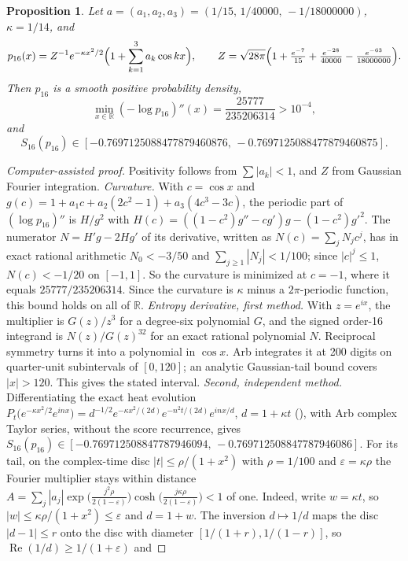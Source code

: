\documentclass[11pt]{article}
\newtheorem{proposition}[theorem]{Proposition}
\theoremstyle{definition}
\theoremstyle{remark}
\newcommand{\R}{\mathbb R}
\begin{document}
\begin{proposition}\label{prop:witness}
Let $a=(a_1,a_2,a_3)=(1/15,\,1/40000,\,-1/18000000)$, $\kappa=1/14$, and
\[
 p_{16}(x)=Z^{-1}e^{-\kappa x^2/2}\Bigl(1+\sum_{k=1}^3a_k\cos kx\Bigr),\qquad
 Z=\sqrt{28\pi}\Bigl(1+\tfrac{e^{-7}}{15}+\tfrac{e^{-28}}{40000}
 -\tfrac{e^{-63}}{18000000}\Bigr).
\]
Then $p_{16}$ is a smooth positive probability density,
\[
 \min_{x\in\R}(-\log p_{16})''(x)=\frac{25777}{235206314}>10^{-4},
\]
and
\[
 S_{16}(p_{16})\in[-0.7697125088477879460876,\,-0.7697125088477879460875].
\]
\end{proposition}

\begin{proof}[Computer-assisted proof]
Positivity follows from $\sum|a_k|<1$, and $Z$ from Gaussian Fourier integration.
\emph{Curvature.} With $c=\cos x$ and
$g(c)=1+a_1c+a_2(2c^2-1)+a_3(4c^3-3c)$, the periodic part of $(\log p_{16})''$ is
$H/g^2$ with $H(c)=((1-c^2)g''-cg')g-(1-c^2)g'^2$. The numerator $N=H'g-2Hg'$ of its
derivative, written as $N(c)=\sum_jN_jc^j$, has in exact rational arithmetic
$N_0<-3/50$ and $\sum_{j\ge1}|N_j|<1/100$; since $|c|^j\le1$, $N(c)<-1/20$ on $[-1,1]$. So the
curvature is minimized at $c=-1$, where it equals $25777/235206314$. Since the
curvature is $\kappa$ minus a $2\pi$-periodic function, this bound holds on all of $\R$.
\emph{Entropy derivative, first method.} With $z=e^{ix}$, the multiplier is
$G(z)/z^3$ for a degree-six polynomial $G$, and the signed order-16 integrand is
$N(z)/G(z)^{32}$ for an exact rational polynomial $N$. Reciprocal symmetry turns it
into a polynomial in $\cos x$. Arb integrates it at 200 digits on quarter-unit
subintervals of $[0,120]$; an analytic Gaussian-tail bound covers $|x|>120$. This gives
the stated interval.
\emph{Second, independent method.} Differentiating the exact heat evolution
$P_t\bigl(e^{-\kappa x^2/2}e^{inx}\bigr)=d^{-1/2}e^{-\kappa x^2/(2d)}e^{-n^2t/(2d)}e^{inx/d}$,
$d=1+\kappa t$ (\cite[Lemma~3]{ZFGW26}), with Arb complex Taylor series, without the
score recurrence, gives
$S_{16}(p_{16})\in[-0.769712508847787946094,\,-0.769712508847787946086]$.
For its tail, on the complex-time disc $|t|\le\rho/(1+x^2)$ with $\rho=1/100$ and
$\varepsilon=\kappa\rho$ the Fourier multiplier stays within distance
$A=\sum_j|a_j|\exp\bigl(\tfrac{j^2\rho}{2(1-\varepsilon)}\bigr)
\cosh\bigl(\tfrac{j\kappa\rho}{2(1-\varepsilon)}\bigr)<1$ of one. Indeed, write
$w=\kappa t$, so $|w|\le\kappa\rho/(1+x^2)\le\varepsilon$ and $d=1+w$. The inversion
$d\mapsto1/d$ maps the disc $|d-1|\le r$ onto the disc with diameter
$[1/(1+r),1/(1-r)]$, so $\operatorname{Re}(1/d)\ge1/(1+\varepsilon)$ and

\end{proof}
\end{document}
